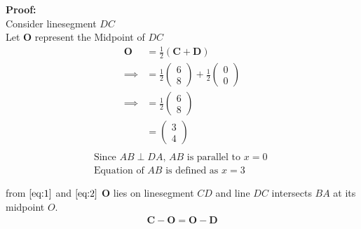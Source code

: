 \documentclass{article}
\newcommand{\myvec}[1]{\ensuremath{\begin{pmatrix}#1\end{pmatrix}}}
\let\vec\mathbf
\begin{document}
\textbf{Proof:}\\
Consider linesegment $DC$\\
Let $\vec{O}$ represent the Midpoint of $DC$
\begin{align}
	\vec{O}&=\frac{1}{2}(\vec{C}+\vec{D})\\
	\implies &= \frac{1}{2}\myvec{6\\8}+\frac{1}{2}\myvec{0\\0}\\
	\implies &= \frac{1}{2}\myvec{6\\8}\\
		 &=\myvec{3\\4}
		 \label{eq:1}\\
\end{align}
\begin{align}
	\text { Since $AB\perp DA$, $AB$ is parallel to $x=0$ }\\
	\text { Equation of $AB$ is defined as $x=3$}\\
	\label{eq:2}\\
\end{align}
from $\eqref{eq:1}$ and $\eqref{eq:2}$
$\vec{O}$ lies on linesegment $CD$ and line $DC$ intersects $BA$ at its midpoint $O$.
\begin{align}
\vec{C}-\vec{O}=\vec{O}-\vec{D}
\end{align}
\end{document}

